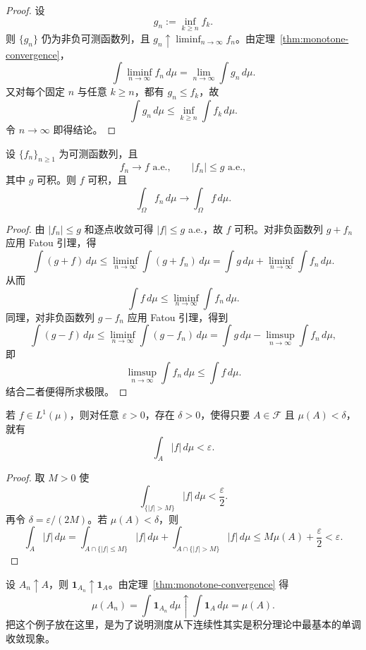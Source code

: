 \begin{proof}
设
\[
g_n:=\inf_{k\ge n} f_k.
\]
则 $\{g_n\}$ 仍为非负可测函数列，且 $g_n\uparrow \liminf_{n\to\infty}f_n$。由定理~\ref{thm:monotone-convergence}，
\[
\int \liminf_{n\to\infty}f_n\,d\mu
=
\lim_{n\to\infty}\int g_n\,d\mu.
\]
又对每个固定 $n$ 与任意 $k\ge n$，都有 $g_n\le f_k$，故
\[
\int g_n\,d\mu\le \inf_{k\ge n}\int f_k\,d\mu.
\]
令 $n\to\infty$ 即得结论。
\end{proof}

\begin{theorem}[控制收敛定理]\label{thm:dominated-convergence}
设 $\{f_n\}_{n\ge1}$ 为可测函数列，且
\[
f_n\to f \text{ a.e.},\qquad |f_n|\le g \text{ a.e.},
\]
其中 $g$ 可积。则 $f$ 可积，且
\[
\int_\Omega f_n\,d\mu\to \int_\Omega f\,d\mu.
\]
\end{theorem}

\begin{proof}
由 $|f_n|\le g$ 和逐点收敛可得 $|f|\le g$ a.e.，故 $f$ 可积。对非负函数列 $g+f_n$ 应用 Fatou 引理，得
\[
\int (g+f)\,d\mu
\le
\liminf_{n\to\infty}\int (g+f_n)\,d\mu
=
\int g\,d\mu+\liminf_{n\to\infty}\int f_n\,d\mu.
\]
从而
\[
\int f\,d\mu\le \liminf_{n\to\infty}\int f_n\,d\mu.
\]
同理，对非负函数列 $g-f_n$ 应用 Fatou 引理，得到
\[
\int (g-f)\,d\mu
\le
\liminf_{n\to\infty}\int (g-f_n)\,d\mu
=
\int g\,d\mu-\limsup_{n\to\infty}\int f_n\,d\mu,
\]
即
\[
\limsup_{n\to\infty}\int f_n\,d\mu\le \int f\,d\mu.
\]
结合二者便得所求极限。
\end{proof}

\begin{proposition}[积分的绝对连续性]\label{prop:absolute-continuity-integral}
若 $f\in L^1(\mu)$，则对任意 $\varepsilon>0$，存在 $\delta>0$，使得只要 $A\in \mathscr F$ 且 $\mu(A)<\delta$，就有
\[
\int_A |f|\,d\mu<\varepsilon.
\]
\end{proposition}

\begin{proof}
取 $M>0$ 使
\[
\int_{\{|f|>M\}} |f|\,d\mu<\frac{\varepsilon}{2}.
\]
再令 $\delta=\varepsilon/(2M)$。若 $\mu(A)<\delta$，则
\[
\int_A |f|\,d\mu
=
\int_{A\cap\{|f|\le M\}}|f|\,d\mu+\int_{A\cap\{|f|>M\}}|f|\,d\mu
\le
M\mu(A)+\frac{\varepsilon}{2}
<
\varepsilon.
\]
\end{proof}

\begin{example}\label{ex:indicator-approximation}
设 $A_n\uparrow A$，则 $\mathbf 1_{A_n}\uparrow \mathbf 1_A$。由定理~\ref{thm:monotone-convergence} 得
\[
\mu(A_n)=\int \mathbf 1_{A_n}\,d\mu \uparrow \int \mathbf 1_A\,d\mu=\mu(A).
\]
把这个例子放在这里，是为了说明测度从下连续性其实是积分理论中最基本的单调收敛现象。
\end{example}

